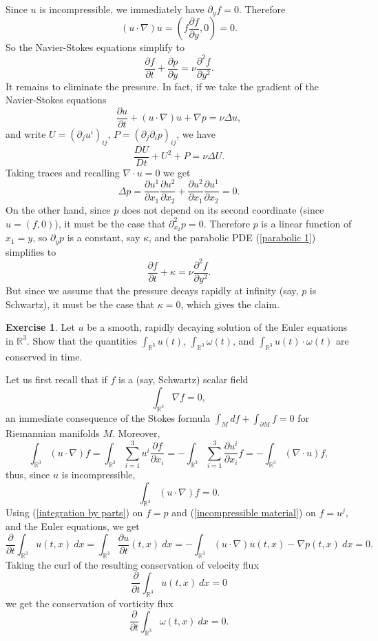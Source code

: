 \documentclass[10pt]{article}
\newcommand{\RR}{\mathbb{R}}
\theoremstyle{definition}
\newtheorem{exer}{Exercise}
\begin{document}
Since $u$ is incompressible, we immediately have $\partial_y f = 0$. Therefore
$$(u \cdot \nabla)u = \left(f\frac{\partial f}{\partial y}, 0\right) = 0.$$
So the Navier-Stokes equations simplify to
\begin{equation}
\label{parabolic 1}
\frac{\partial f}{\partial t} + \frac{\partial p}{\partial y} = \nu \frac{\partial^2 f}{\partial y^2}.
\end{equation}
It remains to eliminate the pressure. In fact, if we take the gradient of the Navier-Stokes equations
$$\frac{\partial u}{\partial t} + (u \cdot \nabla)u + \nabla p = \nu \Delta u,$$
and write $U = (\partial_j u^i)_{ij}$, $P = (\partial_j \partial_i p)_{ij}$, we have
$$\frac{DU}{Dt} + U^2 + P = \nu \Delta U.$$
Taking traces and recalling $\nabla \cdot u = 0$ we get
$$\Delta p = \frac{\partial u^1}{\partial x_1} \frac{\partial u^2}{\partial x_2} + \frac{\partial u^2}{\partial x_1} \frac{\partial u^1}{\partial x_2} = 0.$$
On the other hand, since $p$ does not depend on its second coordinate (since $u = (f, 0)$), it must be the case that $\partial_{x_2}^2 p = 0$.
Therefore $p$ is a linear function of $x_1 = y$, so $\partial_y p$ is a constant, say $\kappa$, and the parabolic PDE (\ref{parabolic 1}) simplifies to
$$\frac{\partial f}{\partial t} + \kappa = \nu \frac{\partial^2 f}{\partial y^2}.$$
But since we assume that the pressure decays rapidly at infinity (say, $p$ is Schwartz), it must be the case that $\kappa = 0$, which gives the claim.

\begin{exer}
Let $u$ be a smooth, rapidly decaying solution of the Euler equations in $\RR^3$.
Show that the quantities $\int_{\RR^3} u(t)$, $\int_{\RR^3} \omega(t)$, and $\int_{\RR^3} u(t) \cdot \omega(t)$ are conserved in time.
\end{exer}

Let us first recall that if $f$ is a (say, Schwartz) scalar field
\begin{equation}
\label{integration by parts}
\int_{\RR^3} \nabla f = 0,
\end{equation}
an immediate consequence of the Stokes formula $\int_M df + \int_{\partial M} f = 0$ for Riemannian manifolds $M$.
Moreover,
$$\int_{\RR^3} (u \cdot \nabla)f = \int_{\RR^3} \sum_{i=1}^3 u^i \frac{\partial f}{\partial x_i} = - \int_{\RR^3} \sum_{i=1}^3 \frac{\partial u^i}{\partial x_i} f = -\int_{\RR^3} (\nabla \cdot u)f,$$
thus, since $u$ is incompressible,
\begin{equation}
\label{incompressible material}
\int_{\RR^3} (u \cdot \nabla)f = 0.
\end{equation}
Using (\ref{integration by parts}) on $f = p$ and (\ref{incompressible material}) on $f = u^j$, and the Euler equations, we get
$$\frac{\partial}{\partial t} \int_{\RR^3} u(t, x) ~dx = \int_{\RR^3} \frac{\partial u}{\partial t}(t, x) ~dx = -\int_{\RR^3} (u \cdot \nabla)u(t, x) - \nabla p(t, x) ~dx = 0.$$
Taking the curl of the resulting conservation of velocity flux
$$\frac{\partial}{\partial t} \int_{\RR^3} u(t, x)~dx = 0$$
we get the conservation of vorticity flux
$$\frac{\partial}{\partial t} \int_{\RR^3} \omega(t, x) ~dx = 0.$$
\end{document}
